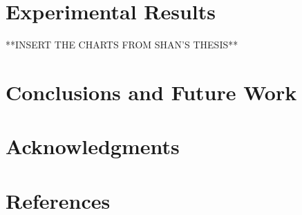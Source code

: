\documentclass[11pt,psfig]{article}
\begin{document}
\section*{Experimental Results}

**INSERT THE CHARTS FROM SHAN'S THESIS**

\section*{Conclusions and Future Work}

\section*{Acknowledgments}

\section*{References}    

\end{document}
